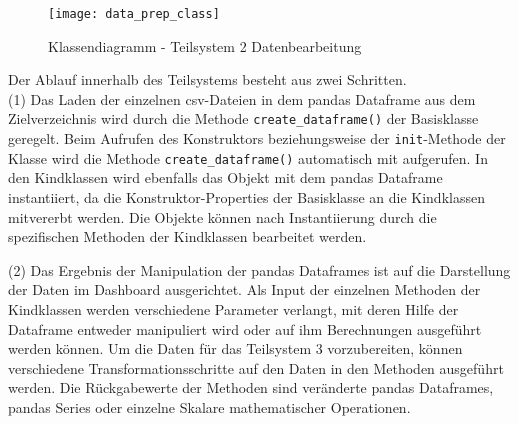     \begin{sidewaysfigure}

        \centering
            \texttt{[image: data\_prep\_class]}
            \caption{Klassendiagramm - Teilsystem 2 Datenbearbeitung}
            \label{fig:classes data_prep}
    \end{sidewaysfigure}

    Der Ablauf innerhalb des Teilsystems besteht aus zwei Schritten.\\
    (1) Das Laden der einzelnen csv-Dateien in dem pandas Dataframe aus dem Zielverzeichnis wird durch die Methode \texttt{create\_dataframe()} der Basisklasse geregelt.
    Beim Aufrufen des Konstruktors beziehungsweise der \texttt{init}-Methode der Klasse wird die Methode \texttt{create\_dataframe()} 
    automatisch mit aufgerufen. In den Kindklassen wird ebenfalls das Objekt mit dem pandas Dataframe instantiiert, da die Konstruktor-Properties der Basisklasse 
    an die Kindklassen mitvererbt werden. Die Objekte können nach Instantiierung durch die spezifischen Methoden der Kindklassen bearbeitet werden.
    
    (2) Das Ergebnis der Manipulation der pandas Dataframes ist auf die Darstellung der Daten im Dashboard ausgerichtet. Als Input der einzelnen Methoden der
    Kindklassen werden verschiedene Parameter verlangt, mit deren Hilfe der Dataframe entweder manipuliert wird oder auf ihm Berechnungen ausgeführt werden können. 
    Um die Daten für das Teilsystem 3 vorzubereiten, können verschiedene Transformationsschritte auf den Daten in den Methoden ausgeführt werden. 
    Die Rückgabewerte der Methoden sind veränderte pandas Dataframes, pandas Series oder einzelne Skalare mathematischer Operationen.
    
    

        
